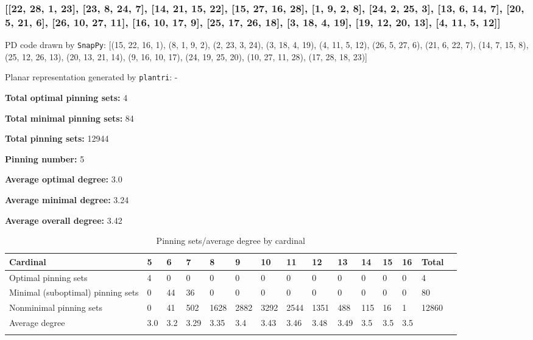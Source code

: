 \documentclass{article}%
\begin{document}
\newpage

\subsubsection{[[22, 28, 1, 23], [23, 8, 24, 7], [14, 21, 15, 22], [15, 27, 16, 28], [1, 9, 2, 8], [24, 2, 25, 3], [13, 6, 14, 7], [20, 5, 21, 6], [26, 10, 27, 11], [16, 10, 17, 9], [25, 17, 26, 18], [3, 18, 4, 19], [19, 12, 20, 13], [4, 11, 5, 12]]}

{\small\noindent PD code drawn by \texttt{SnapPy}: [(15, 22, 16, 1), (8, 1, 9, 2), (2, 23, 3, 24), (3, 18, 4, 19), (4, 11, 5, 12), (26, 5, 27, 6), (21, 6, 22, 7), (14, 7, 15, 8), (25, 12, 26, 13), (20, 13, 21, 14), (9, 16, 10, 17), (24, 19, 25, 20), (10, 27, 11, 28), (17, 28, 18, 23)]}

{\small\noindent Planar representation generated by \texttt{plantri}: -}

\begin{multicols}{2}
{\normalsize \noindent\textbf{Total optimal pinning sets:} 4

\noindent\textbf{Total minimal pinning sets:} 84

\noindent\textbf{Total pinning sets:} 12944

\noindent\textbf{Pinning number:} 5

}
\columnbreak

{\normalsize \noindent\textbf{Average optimal degree:} 3.0

\noindent\textbf{Average minimal degree:} 3.24

\noindent\textbf{Average overall degree:} 3.42

}
\end{multicols}

\begin{table}[ht]
	\caption{Pinning sets/average degree by cardinal}
	\centering
	\renewcommand{\arraystretch}{1.5}
	\begin{tabularx}{\textwidth}{lXXXXXXXXXXXXXX}
		\toprule
			Cardinal & 5 & 6 & 7 & 8 & 9 & 10 & 11 & 12 & 13 & 14 & 15 & 16 & Total\\
			\hline
			Optimal pinning sets & 4 & 0 & 0 & 0 & 0 & 0 & 0 & 0 & 0 & 0 & 0 & 0 & 4 \\
			Minimal (suboptimal) pinning sets & 0 & 44 & 36 & 0 & 0 & 0 & 0 & 0 & 0 & 0 & 0 & 0 & 80 \\
			Nonminimal pinning sets & 0 & 41 & 502 & 1628 & 2882 & 3292 & 2544 & 1351 & 488 & 115 & 16 & 1 & 12860 \\
			Average degree & 3.0 & 3.2 & 3.29 & 3.35 & 3.4 & 3.43 & 3.46 & 3.48 & 3.49 & 3.5 & 3.5 & 3.5 &  \\
		\bottomrule \\ 
	\end{tabularx}
\end{table}
\end{document}
